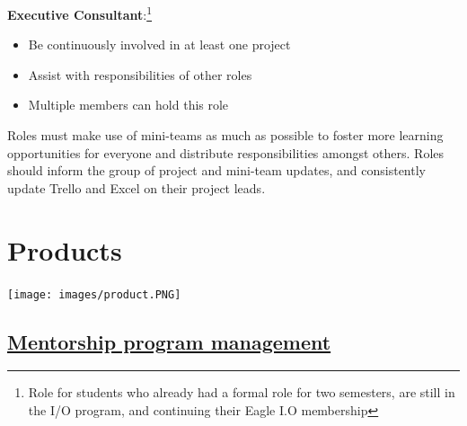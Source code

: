 \documentclass[
]{book}
\providecommand{\tightlist}{%
  \setlength{\itemsep}{0pt}\setlength{\parskip}{0pt}}
\begin{document}
\textbf{Executive Consultant}:\footnote{Role for students who already had a formal role for two semesters, are still in the I/O program, and continuing their Eagle I.O membership}

\begin{itemize}
\tightlist
\item
  Be continuously involved in at least one project
\item
  Assist with responsibilities of other roles\\
\item
  Multiple members can hold this role
\end{itemize}

Roles must make use of mini-teams as much as possible to foster more learning opportunities for everyone and distribute responsibilities amongst others. Roles should inform the group of project and mini-team updates, and consistently update Trello and Excel on their project leads.

\hypertarget{products}{%
\chapter{Products}\label{products}}

\texttt{[image: images/product.PNG]}

\hypertarget{mentorship-program-management}{%
\section{\texorpdfstring{\href{https://bookdown.org/kulasj/mentoruser/}{Mentorship program management}}{Mentorship program management}}\label{mentorship-program-management}}
\end{document}
